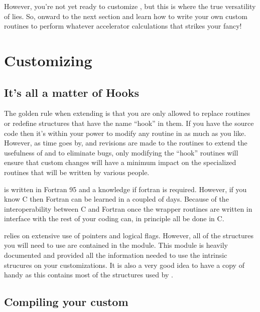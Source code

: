 However, you're not yet ready to customize \tao, but this is where the true versatility
of \tao lies. So, onward to the next section and learn how to write your
own custom routines to perform whatever accelerator calculations that strikes your
fancy!

\chapter{Customizing \tao}
\label{c:custom_tao}

\section{It's all a matter of Hooks}

The golden rule when extending \tao is that you are only allowed to replace
routines or redefine structures that have the name ``hook'' in them.  If you
have the source code then it's within your power to modify any routine in \tao
as much as you like. However, as time goes by, and revisions are made to the
\tao routines to extend the usefulness of \tao and to eliminate bugs, only
modifying the ``hook'' routines will ensure that custom changes will have a
minimum impact on the specialized routines that will be written by various
people. 

\tao is written in Fortran 95 and a knowledge if fortran is required. However,
if you know C then Fortran can be learned in a coupled of days. Because of the
interoperability between C and Fortran once the wrapper routines are written in
interface with \tao the rest of your coding can, in principle all be done in C.

\tao relies on extensive use of pointers and logical flags. However, all of the
structures you will need to use are contained in the 
module. This module is heavily documented and provided all the information
needed to use the intrinsic \tao strucures on your customizations. It is also a
very good idea to have a copy of  handy as this contains
most of the structures used by \bmad.

\section{Compiling your custom \tao}

